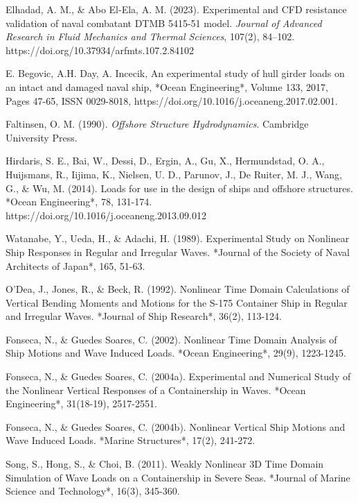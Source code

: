 \documentclass[12pt]{article} %
\begin{document}
\begin{thebibliography}{99}
     Elhadad, A. M., \& Abo El-Ela, A. M. (2023). Experimental and CFD resistance validation of naval combatant DTMB 5415-51 model. \textit{Journal of Advanced Research in Fluid Mechanics and Thermal Sciences}, 107(2), 84–102. https://doi.org/10.37934/arfmts.107.2.84102
    
     E. Begovic, A.H. Day, A. Incecik, An experimental study of hull girder loads on an intact and damaged naval ship, *Ocean Engineering*, Volume 133, 2017, Pages 47-65, ISSN 0029-8018, https://doi.org/10.1016/j.oceaneng.2017.02.001.

     Faltinsen, O. M. (1990). \textit{Offshore Structure Hydrodynamics}. Cambridge University Press.

     Hirdaris, S. E., Bai, W., Dessi, D., Ergin, A., Gu, X., Hermundstad, O. A., Huijsmans, R., Iijima, K., Nielsen, U. D., Parunov, J., De Ruiter, M. J., Wang, G., \& Wu, M. (2014). Loads for use in the design of ships and offshore structures. *Ocean Engineering*, 78, 131-174. https://doi.org/10.1016/j.oceaneng.2013.09.012
    
     Watanabe, Y., Ueda, H., \& Adachi, H. (1989). Experimental Study on Nonlinear Ship Responses in Regular and Irregular Waves. *Journal of the Society of Naval Architects of Japan*, 165, 51-63.

     O'Dea, J., Jones, R., \& Beck, R. (1992). Nonlinear Time Domain Calculations of Vertical Bending Moments and Motions for the S-175 Container Ship in Regular and Irregular Waves. *Journal of Ship Research*, 36(2), 113-124.

     Fonseca, N., \& Guedes Soares, C. (2002). Nonlinear Time Domain Analysis of Ship Motions and Wave Induced Loads. *Ocean Engineering*, 29(9), 1223-1245.

     Fonseca, N., \& Guedes Soares, C. (2004a). Experimental and Numerical Study of the Nonlinear Vertical Responses of a Containership in Waves. *Ocean Engineering*, 31(18-19), 2517-2551.

     Fonseca, N., \& Guedes Soares, C. (2004b). Nonlinear Vertical Ship Motions and Wave Induced Loads. *Marine Structures*, 17(2), 241-272.

     Song, S., Hong, S., \& Choi, B. (2011). Weakly Nonlinear 3D Time Domain Simulation of Wave Loads on a Containership in Severe Seas. *Journal of Marine Science and Technology*, 16(3), 345-360.


\end{thebibliography}
\end{document}
